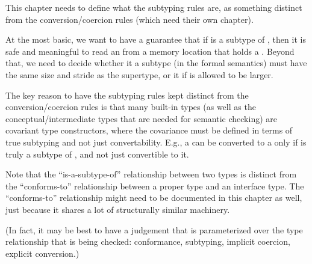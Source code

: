 
\begin{TODO}

This chapter needs to define what the subtyping rules are, as something distinct from the conversion/coercion rules (which need their own chapter).

At the most basic, we want to have a guarantee that if  is a subtype of , then it is safe and meaningful to read an  from a memory location that holds a .
Beyond that, we need to decide whether it a subtype (in the formal semantics) must have the same size and stride as the supertype, or it if is allowed to be larger.

The key reason to have the subtyping rules kept distinct from the conversion/coercion rules is that many built-in types (as well as the conceptual/intermediate types that are needed for semantic checking) are covariant type constructors, where the covariance must be defined in terms of true subtyping and not just convertability. E.g., a  can be converted to a  only if  is truly a subtype of , and not just convertible to it.

Note that the ``is-a-subtype-of'' relationship between two types is distinct from the ``conforms-to'' relationship between a proper type and an interface type.
The ``conforms-to'' relationship might need to be documented in this chapter as well, just because it shares a lot of structurally similar machinery.

(In fact, it may be best to have a judgement that is parameterized over the type relationship that is being checked: conformance, subtyping, implicit coercion, explicit conversion.)

\end{TODO}
